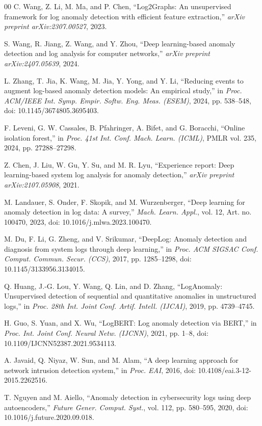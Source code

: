 \documentclass[10pt,conference]{IEEEtran}
\begin{document}
\begin{thebibliography}{00}
 C. Wang, Z. Li, M. Ma, and P. Chen, ``Log2Graphs: An unsupervised framework for log anomaly detection with efficient feature extraction,'' \emph{arXiv preprint arXiv:2307.00527}, 2023.

 S. Wang, R. Jiang, Z. Wang, and Y. Zhou, ``Deep learning-based anomaly detection and log analysis for computer networks,'' \emph{arXiv preprint arXiv:2407.05639}, 2024.

 L. Zhang, T. Jia, K. Wang, M. Jia, Y. Yong, and Y. Li, ``Reducing events to augment log-based anomaly detection models: An empirical study,'' in \emph{Proc. ACM/IEEE Int. Symp. Empir. Softw. Eng. Meas. (ESEM)}, 2024, pp. 538--548, doi: 10.1145/3674805.3695403.

 F. Leveni, G. W. Cassales, B. Pfahringer, A. Bifet, and G. Boracchi, ``Online isolation forest,'' in \emph{Proc. 41st Int. Conf. Mach. Learn. (ICML)}, PMLR vol. 235, 2024, pp. 27288--27298.

 Z. Chen, J. Liu, W. Gu, Y. Su, and M. R. Lyu, ``Experience report: Deep learning-based system log analysis for anomaly detection,'' \emph{arXiv preprint arXiv:2107.05908}, 2021.

 M. Landauer, S. Onder, F. Skopik, and M. Wurzenberger, ``Deep learning for anomaly detection in log data: A survey,'' \emph{Mach. Learn. Appl.}, vol. 12, Art. no. 100470, 2023, doi: 10.1016/j.mlwa.2023.100470.

 M. Du, F. Li, G. Zheng, and V. Srikumar, ``DeepLog: Anomaly detection and diagnosis from system logs through deep learning,'' in \emph{Proc. ACM SIGSAC Conf. Comput. Commun. Secur. (CCS)}, 2017, pp. 1285--1298, doi: 10.1145/3133956.3134015.

 Q. Huang, J.-G. Lou, Y. Wang, Q. Lin, and D. Zhang, ``LogAnomaly: Unsupervised detection of sequential and quantitative anomalies in unstructured logs,'' in \emph{Proc. 28th Int. Joint Conf. Artif. Intell. (IJCAI)}, 2019, pp. 4739--4745.

 H. Guo, S. Yuan, and X. Wu, ``LogBERT: Log anomaly detection via BERT,'' in \emph{Proc. Int. Joint Conf. Neural Netw. (IJCNN)}, 2021, pp. 1--8, doi: 10.1109/IJCNN52387.2021.9534113.

 A. Javaid, Q. Niyaz, W. Sun, and M. Alam, ``A deep learning approach for network intrusion detection system,'' in \emph{Proc. EAI}, 2016, doi: 10.4108/eai.3-12-2015.2262516.

 T. Nguyen and M. Aiello, ``Anomaly detection in cybersecurity logs using deep autoencoders,'' \emph{Future Gener. Comput. Syst.}, vol. 112, pp. 580--595, 2020, doi: 10.1016/j.future.2020.09.018.


\end{thebibliography}
\end{document}
